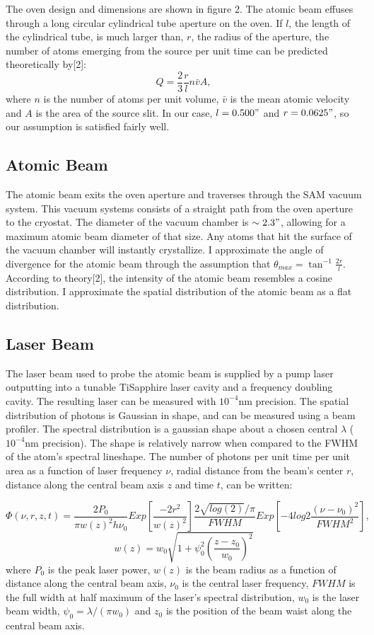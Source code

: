 \documentclass[12pt, a4paper]{article}
\begin{document}
The oven design and dimensions are shown in figure 2. The atomic beam effuses through a long circular cylindrical tube aperture on the oven. If $l$, the length of the cylindrical tube, is much larger than, $r$, the radius of the aperture, the number of atoms emerging from the source per unit time can be predicted theoretically by[2]:
\begin{equation}
Q = \frac{2}{3}\frac{r}{l}n\bar{v}A,
\end{equation}
where $n$ is the number of atoms per unit volume, $\bar{v}$ is the mean atomic velocity and $A$ is the area of the source slit. In our case, $l = 0.500"$ and $r = 0.0625"$, so our assumption is satisfied fairly well.

\subsection{Atomic Beam}
The atomic beam exits the oven aperture and traverses through the SAM vacuum system. This vacuum systems consists of a straight path from the oven aperture to the cryostat. The diameter of the vacuum chamber is $\sim 2.3"$, allowing for a maximum atomic beam diameter of that size. Any atoms that hit the surface of the vacuum chamber will instantly crystallize. I approximate the angle of divergence for the atomic beam through the assumption that $\theta_{max} = \tan^{-1}\frac{2r}{l}$. According to theory[2], the intensity of the atomic beam resembles a cosine distribution. I approximate the spatial distribution of the atomic beam as a flat distribution.
\subsection{Laser Beam}
The laser beam used to probe the atomic beam is supplied by a pump laser outputting into a tunable TiSapphire laser cavity and a frequency doubling cavity. The resulting laser can be measured with $10^{-4}$nm precision. The spatial distribution of photons is Gaussian in shape, and can be measured using a beam profiler. The spectral distribution is a gaussian shape about a chosen central $\lambda$ ($10^{-4}$nm precision). The shape is relatively narrow when compared to the FWHM of the atom's spectral lineshape. The number of photons per unit time per unit area as a function of laser frequency $\nu$, radial distance from the beam's center $r$, distance along the central beam axis $z$ and time $t$, can be written:

\begin{equation}
\Phi(\nu,r,z,t) = \frac{2P_0}{\pi w(z)^2 h \nu_0} Exp[\frac{-2r^2}{w(z)^2}]\frac{2\sqrt{log(2)}/\pi}{FWHM}Exp[-4log{2}\frac{(\nu-\nu_0)^2}{FWHM^2}],
\end{equation}
\begin{equation}
w(z) = w_0\sqrt{1+\psi_0^2(\frac{z-z_0}{w_0})^2}
\end{equation}
where $P_0$ is the peak laser power, $w(z)$ is the beam radius as a function of distance along the central beam axis, $\nu_0$ is the central laser frequency, $FWHM$ is the full width at half maximum of the laser's spectral distribution, $w_0$ is the laser beam width, $\psi_0 = \lambda/(\pi w_0)$ and $z_0$ is the position of the beam waist along the central beam axis.
\end{document}
